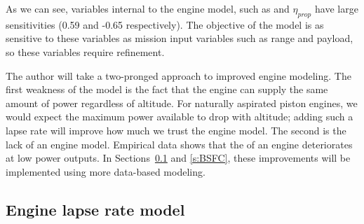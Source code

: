 \begin{footnotesize}
\end{footnotesize}

As we can see, variables internal to the engine model, such as \BSFC and $\eta_{prop}$ have
large sensitivities (0.59 and -0.65 respectively). The objective of the model
is as sensitive to these variables as mission input variables such as range and payload, so
these variables require refinement.


The author will take a two-pronged approach to improved engine modeling.
The first weakness of the model is the fact that the engine can supply the same amount of power
regardless of altitude. For naturally aspirated piston engines, we would expect the maximum power available to
drop with altitude; adding such a lapse rate will improve how much we trust the engine model.
The second is the lack of an engine \BSFC model. Empirical data shows that the
\BSFC of an engine deteriorates at low power outputs.
In Sections~\ref{s:lapse} and \ref{s:BSFC}, these improvements will be implemented using more data-based modeling.

\subsection{Engine lapse rate model}
\label{s:lapse}

